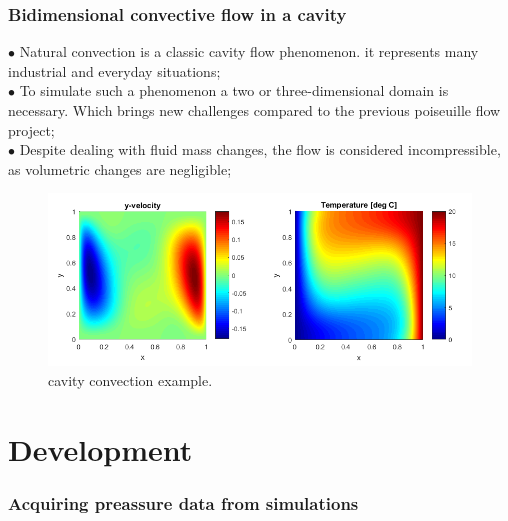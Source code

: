 \documentclass[xcolor=dvipsnames,10pt,aspectratio=169]{beamer}
\begin{document}
\begin{frame}\frametitle{Bidimensional convective flow in a cavity}
	\begin{minipage}[h!]{0.39\textwidth}
		$\bullet$ Natural convection is a classic cavity flow phenomenon. it represents many industrial and everyday situations;\\
		$\bullet$ To simulate such a phenomenon a two or three-dimensional domain is necessary. Which brings new challenges compared to the previous poiseuille flow project;\\
		$\bullet$ Despite dealing with fluid mass changes, the flow is considered incompressible, as volumetric changes are negligible;\\

	\end{minipage}
	\begin{minipage}[h!]{0.6\textwidth}
		\begin{figure}[h!]
			\centering
			\includegraphics[trim = {0cm 0cm 0cm 0cm}, clip , angle=0, scale=0.45]{./my_images/NaturalConvectionFromNet.png}
			\caption{cavity convection example.}
		\end{figure}
	\end{minipage}
\end{frame}

\section{Development}
\begin{frame}\frametitle{Acquiring preassure data from simulations}
	\centering
\end{frame}
\end{document}
